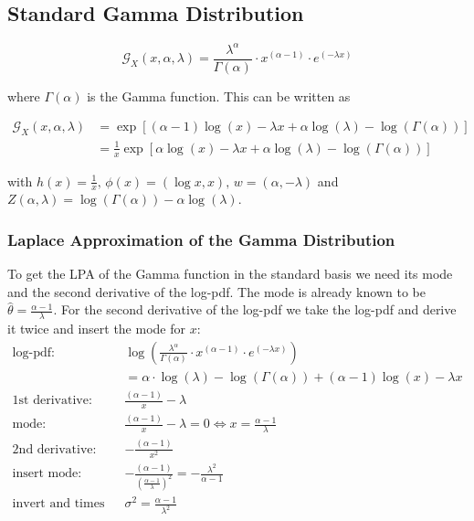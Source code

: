 \subsection{Standard Gamma Distribution}

\begin{equation}
	\mathcal{G}_X(x, \alpha, \lambda) = \frac{\lambda^\alpha}{\Gamma(\alpha)} \cdot x^{(\alpha - 1)} \cdot e^{(-\lambda x)}
	\label{eq:gamma_pdf}
\end{equation}

where $\Gamma(\alpha)$ is the Gamma function. This can be written as

\begin{subequations}
\begin{align}
	\mathcal{G}_X(x, \alpha, \lambda) &= \exp \left[(\alpha -1)\log(x) - \lambda x + \alpha \log(\lambda) - \log(\Gamma(\alpha))\right] \\
	&= \frac{1}{x} \exp\left[\alpha\log(x) - \lambda x + \alpha \log(\lambda) - \log(\Gamma(\alpha))\right]
	\label{eq:gamma_exp_family}
\end{align}
\end{subequations}

with $h(x) = \frac{1}{x},\, \phi(x)=(\log x, x),\, w=(\alpha, -\lambda)$ and $Z(\alpha, \lambda) = \log(\Gamma(\alpha)) - \alpha  \log(\lambda)$. 

\subsubsection{Laplace Approximation of the Gamma Distribution}

To get the LPA of the Gamma function in the standard basis we need its mode and the second derivative of the log-pdf. The mode is already known to be $\hat{\theta} = \frac{\alpha -1}{\lambda}$. For the second derivative of the log-pdf we take the log-pdf and derive it twice and insert the mode for $x$:
\begin{align*}
	\text{log-pdf: } &\log\left( \frac{\lambda^\alpha}{\Gamma(\alpha)} \cdot x^{(\alpha - 1)} \cdot e^{(-\lambda x)}\right) \\
	&= \alpha \cdot \log(\lambda) - \log(\Gamma(\alpha)) + (\alpha -1)\log(x) -\lambda x\\
	\text{1st derivative: }& \frac{(\alpha-1)}{x} - \lambda \\
	\text{mode: }&  \frac{(\alpha-1)}{x} - \lambda = 0 \Leftrightarrow x=\frac{\alpha -1}{\lambda}\\
	\text{2nd derivative: }& -\frac{(\alpha-1)}{x^2}\\
	\text{insert mode: }& -\frac{(\alpha-1)}{(\frac{\alpha -1}{\lambda})^2} = -\frac{\lambda^2}{\alpha - 1} \\
	\text{invert and times -1: }&\sigma^2 = \frac{\alpha-1}{\lambda^2}
\end{align*}

